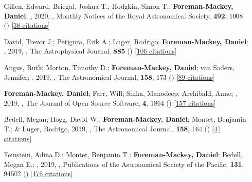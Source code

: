 \item[{\color{numcolor}\scriptsize52}] Gillen, Edward; Briegal, Joshua T.; Hodgkin, Simon T.; \textbf{Foreman-Mackey, Daniel}; \etal, 2020, , Monthly Notices of the Royal Astronomical Society, \textbf{492}, 1008 () [\href{https://ui.adsabs.harvard.edu/abs/2020MNRAS.492.1008G}{38 citations}]

\item[{\color{numcolor}\scriptsize51}] David, Trevor J.; Petigura, Erik A.; Luger, Rodrigo; \textbf{Foreman-Mackey, Daniel}; \etal, 2019, , The Astrophysical Journal, \textbf{885} () [\href{https://ui.adsabs.harvard.edu/abs/2019ApJ...885L..12D}{106 citations}]

\item[{\color{numcolor}\scriptsize50}] Angus, Ruth; Morton, Timothy D.; \textbf{Foreman-Mackey, Daniel}; van Saders, Jennifer; \etal, 2019, , The Astronomical Journal, \textbf{158}, 173 () [\href{https://ui.adsabs.harvard.edu/abs/2019AJ....158..173A}{89 citations}]

\item[{\color{numcolor}\scriptsize49}] \textbf{Foreman-Mackey, Daniel}; Farr, Will; Sinha, Manodeep; Archibald, Anne; \etal, 2019, , The Journal of Open Source Software, \textbf{4}, 1864 () [\href{https://ui.adsabs.harvard.edu/abs/2019JOSS....4.1864F}{157 citations}]

\item[{\color{numcolor}\scriptsize48}] Bedell, Megan; Hogg, David W.; \textbf{Foreman-Mackey, Daniel}; Montet, Benjamin T.; \& Luger, Rodrigo, 2019, , The Astronomical Journal, \textbf{158}, 164 () [\href{https://ui.adsabs.harvard.edu/abs/2019AJ....158..164B}{41 citations}]

\item[{\color{numcolor}\scriptsize47}] Feinstein, Adina D.; Montet, Benjamin T.; \textbf{Foreman-Mackey, Daniel}; Bedell, Megan E.; \etal, 2019, , Publications of the Astronomical Society of the Pacific, \textbf{131}, 94502 () [\href{https://ui.adsabs.harvard.edu/abs/2019PASP..131i4502F}{176 citations}]

